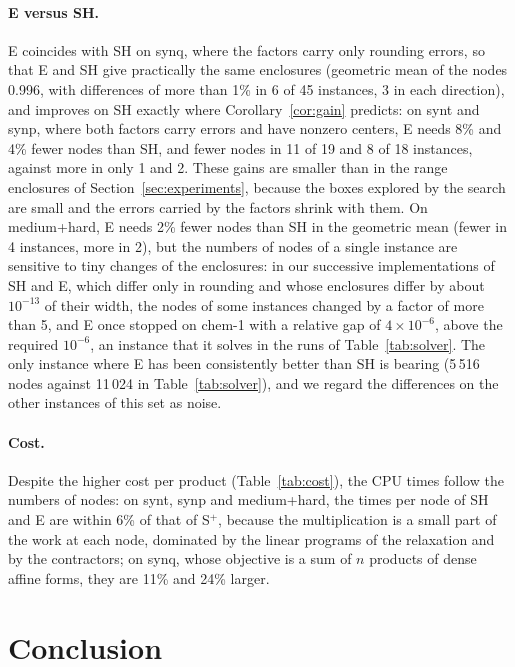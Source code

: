 \documentclass[10pt]{article}
\theoremstyle{definition}
\begin{document}
\paragraph{E versus SH.} E coincides with SH on synq, where the factors carry only rounding errors, so that E and SH give practically the same enclosures (geometric mean of the nodes 0.996, with differences of more than 1\% in 6 of 45 instances, 3 in each direction), and improves on SH exactly where Corollary~\ref{cor:gain} predicts: on synt and synp, where both factors carry errors and have nonzero centers, E needs 8\% and 4\% fewer nodes than SH, and fewer nodes in 11 of 19 and 8 of 18 instances, against more in only 1 and 2. These gains are smaller than in the range enclosures of Section~\ref{sec:experiments}, because the boxes explored by the search are small and the errors carried by the factors shrink with them. On medium+hard, E needs 2\% fewer nodes than SH in the geometric mean (fewer in 4 instances, more in 2), but the numbers of nodes of a single instance are sensitive to tiny changes of the enclosures: in our successive implementations of SH and E, which differ only in rounding and whose enclosures differ by about $10^{-13}$ of their width, the nodes of some instances changed by a factor of more than 5, and E once stopped on chem-1 with a relative gap of $4\times10^{-6}$, above the required $10^{-6}$, an instance that it solves in the runs of Table~\ref{tab:solver}. The only instance where E has been consistently better than SH is bearing (5\,516 nodes against 11\,024 in Table~\ref{tab:solver}), and we regard the differences on the other instances of this set as noise.

\paragraph{Cost.} Despite the higher cost per product (Table~\ref{tab:cost}), the CPU times follow the numbers of nodes: on synt, synp and medium+hard, the times per node of SH and E are within 6\% of that of S$^+$, because the multiplication is a small part of the work at each node, dominated by the linear programs of the relaxation and by the contractors; on synq, whose objective is a sum of $n$ products of dense affine forms, they are 11\% and 24\% larger.


\section{Conclusion}
\end{document}
